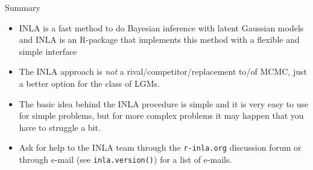 \documentclass[
  ignorenonframetext,
  handout]{beamer}
\begin{document}
\begin{frame}[fragile]{Summary}
\protect\hypertarget{summary}{}
\begin{itemize}
\item
  INLA is a fast method to do Bayesian inference with latent Gaussian
  models and INLA is an R-package that implements this method with a
  flexible and simple interface
\item
  The INLA approach is \emph{not} a rival/competitor/replacement to/of
  MCMC, just a better option for the class of LGMs.
\item
  The basic idea behind the INLA procedure is simple and it is very easy
  to use for simple problems, but for more complex problems it may
  happen that you have to struggle a bit.
\item
  Ask for help to the INLA team through the \texttt{r-inla.org}
  discussion forum or through e-mail (see \texttt{inla.version()}) for a
  list of e-mails.
\end{itemize}
\end{frame}
\end{document}
